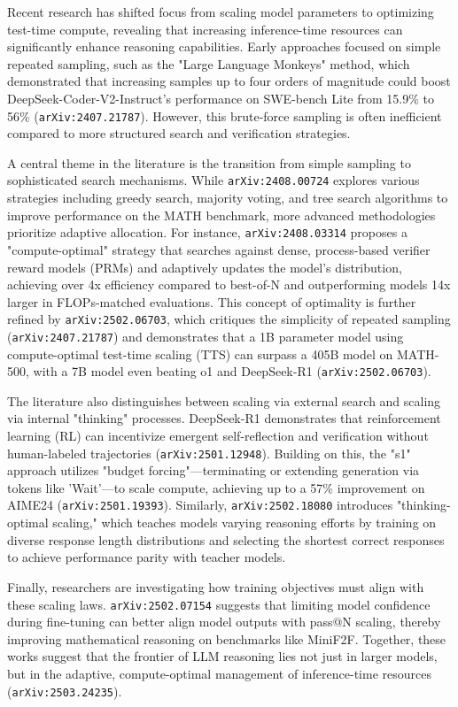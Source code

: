 \documentclass[11pt]{article}
\begin{document}
Recent research has shifted focus from scaling model parameters to optimizing test-time compute, revealing that increasing inference-time resources can significantly enhance reasoning capabilities. Early approaches focused on simple repeated sampling, such as the "Large Language Monkeys" method, which demonstrated that increasing samples up to four orders of magnitude could boost DeepSeek-Coder-V2-Instruct's performance on SWE-bench Lite from 15.9\% to 56\% (\texttt{arXiv:2407.21787}). However, this brute-force sampling is often inefficient compared to more structured search and verification strategies.

A central theme in the literature is the transition from simple sampling to sophisticated search mechanisms. While \texttt{arXiv:2408.00724} explores various strategies including greedy search, majority voting, and tree search algorithms to improve performance on the MATH benchmark, more advanced methodologies prioritize adaptive allocation. For instance, \texttt{arXiv:2408.03314} proposes a "compute-optimal" strategy that searches against dense, process-based verifier reward models (PRMs) and adaptively updates the model's distribution, achieving over 4x efficiency compared to best-of-N and outperforming models 14x larger in FLOPs-matched evaluations. This concept of optimality is further refined by \texttt{arXiv:2502.06703}, which critiques the simplicity of repeated sampling (\texttt{arXiv:2407.21787}) and demonstrates that a 1B parameter model using compute-optimal test-time scaling (TTS) can surpass a 405B model on MATH-500, with a 7B model even beating o1 and DeepSeek-R1 (\texttt{arXiv:2502.06703}).

The literature also distinguishes between scaling via external search and scaling via internal "thinking" processes. DeepSeek-R1 demonstrates that reinforcement learning (RL) can incentivize emergent self-reflection and verification without human-labeled trajectories (\texttt{arXiv:2501.12948}). Building on this, the "s1" approach utilizes "budget forcing"—terminating or extending generation via tokens like 'Wait'—to scale compute, achieving up to a 57\% improvement on AIME24 (\texttt{arXiv:2501.19393}). Similarly, \texttt{arXiv:2502.18080} introduces "thinking-optimal scaling," which teaches models varying reasoning efforts by training on diverse response length distributions and selecting the shortest correct responses to achieve performance parity with teacher models.

Finally, researchers are investigating how training objectives must align with these scaling laws. \texttt{arXiv:2502.07154} suggests that limiting model confidence during fine-tuning can better align model outputs with pass@N scaling, thereby improving mathematical reasoning on benchmarks like MiniF2F. Together, these works suggest that the frontier of LLM reasoning lies not just in larger models, but in the adaptive, compute-optimal management of inference-time resources (\texttt{arXiv:2503.24235}).
\end{document}
